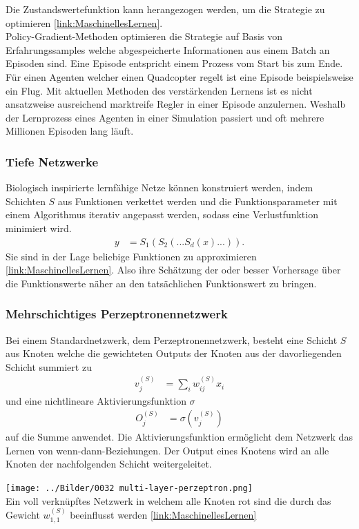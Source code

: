 Die Zustandswertefunktion kann herangezogen werden, um die Strategie zu optimieren \ref{link:MaschinellesLernen}.\\
Policy-Gradient-Methoden optimieren die Strategie auf Basis von Erfahrungssamples welche abgespeicherte Informationen aus einem Batch an Episoden sind. Eine Episode entspricht einem Prozess vom Start bis zum Ende. Für einen Agenten welcher einen Quadcopter regelt ist eine Episode beispielsweise ein Flug. Mit aktuellen Methoden des verstärkenden Lernens ist es nicht ansatzweise ausreichend marktreife Regler in einer Episode anzulernen. Weshalb der Lernprozess eines Agenten in einer Simulation passiert und oft mehrere Millionen Episoden lang läuft.

\subsubsection{Tiefe Netzwerke}
Biologisch inspirierte lernfähige Netze können konstruiert werden, indem Schichten $S$ aus Funktionen verkettet werden und die Funktionsparameter mit einem Algorithmus iterativ angepasst werden, sodass eine Verlustfunktion minimiert wird.
\begin{align}
  y &= S_1(S_2(...S_d(x)...)).
\end{align}
Sie sind in der Lage beliebige Funktionen zu approximieren \ref{link:MaschinellesLernen}. Also ihre Schätzung der oder besser Vorhersage über die Funktionswerte näher an den tatsächlichen Funktionswert zu bringen.
\subsubsection{Mehrschichtiges Perzeptronennetzwerk}
Bei einem Standardnetzwerk, dem Perzeptronennetzwerk, besteht eine Schicht $S$ aus Knoten welche die gewichteten Outputs der Knoten aus der davorliegenden Schicht summiert zu
\begin{align}
  v_j^{(S)} &= \sum_i w_{ij}^{(S)}x_i
\end{align}
und eine nichtlineare Aktivierungsfunktion $\sigma$
\begin{align}
  O_j^{(S)} &= \sigma \left (v_j^{(S)}\right )
\end{align}
auf die Summe anwendet. Die Aktivierungsfunktion ermöglicht dem Netzwerk das Lernen von wenn-dann-Beziehungen. Der Output eines Knotens wird an alle Knoten der nachfolgenden Schicht weitergeleitet.
\vspace*{0.5cm}
\begin{center}
  \texttt{[image: ../Bilder/0032 multi-layer-perzeptron.png]}{\\Ein voll verknüpftes Netzwerk in welchem alle Knoten rot sind die durch das Gewicht $w_{1,1}^{(S)}$ beeinflusst werden \ref{link:MaschinellesLernen}}
\end{center}

